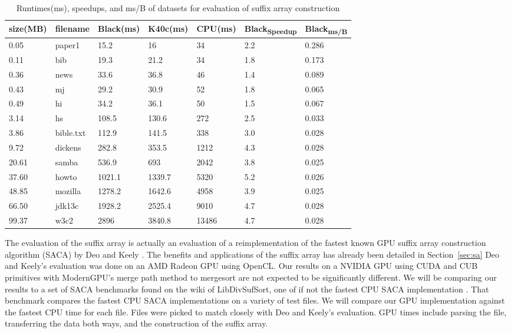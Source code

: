 \begin{table}[h]
\begin{tabular}{@{}lllllll@{}}
\toprule
size(MB) & filename  & Black(ms)  & K40c(ms)   & CPU(ms)   & Black\textsubscript{Speedup} & Black\textsubscript{ms/B} \\ \midrule
0.05     & paper1    & 15.2   & 16     & 34    & 2.2           & 0.286          \\
0.11     & bib       & 19.3   & 21.2   & 34    & 1.8           & 0.173          \\
0.36     & news      & 33.6   & 36.8   & 46    & 1.4           & 0.089          \\
0.43     & mj        & 29.2   & 30.9   & 52    & 1.8           & 0.065          \\
0.49     & hi        & 34.2   & 36.1   & 50    & 1.5           & 0.067          \\
3.14     & hs        & 108.5  & 130.6  & 272   & 2.5           & 0.033          \\
3.86     & bible.txt & 112.9  & 141.5  & 338   & 3.0           & 0.028          \\
9.72     & dickens   & 282.8  & 353.5  & 1212  & 4.3           & 0.028          \\
20.61    & samba     & 536.9  & 693    & 2042  & 3.8           & 0.025          \\
37.60    & howto     & 1021.1 & 1339.7 & 5320  & 5.2           & 0.026          \\
48.85    & mozilla   & 1278.2 & 1642.6 & 4958  & 3.9           & 0.025          \\
66.50    & jdk13c    & 1928.2 & 2525.4 & 9010  & 4.7           & 0.028          \\
99.37    & w3c2      & 2896   & 3840.8 & 13486 & 4.7           & 0.028          \\ \bottomrule
\end{tabular}
\caption{Runtimes(ms), speedups, and ms/B of datasets for evaluation of suffix array construction}
\label{tab:sadata}
\end{table}

The evaluation of the suffix array is actually an evaluation of a reimplementation of the fastest known GPU suffix array construction algorithm (SACA) by Deo and Keely \cite{Deo}.
The benefits and applications of the suffix array has already been detailed in Section~\ref{sec:sa} 
Deo and Keely's evaluation was done on an AMD Radeon GPU using OpenCL.
Our results on a NVIDIA GPU using CUDA and CUB primitives with ModernGPU's merge path method to mergesort are not expected to be significantly different.
We will be comparing our results to a set of SACA benchmarks found on the wiki of LibDivSufSort, one of if not the fastest CPU SACA implementation \cite{SACA}.
That benchmark compares the fastest CPU SACA implementations on a variety of test files.
We will compare our GPU implementation against the fastest CPU time for each file.
Files were picked to match closely with Deo and Keely's evaluation.
GPU times include parsing the file, transferring the data both ways, and the construction of the suffix array.

